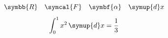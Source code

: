 \documentclass[11pt]{article}
\begin{document}
\[\symbb{R}\quad\symcal{F}\quad\symbf{\alpha}\quad\symup{d}x\]
\[\int_0^1 x^2\,\symup{d}x=\frac13\]
\end{document}

